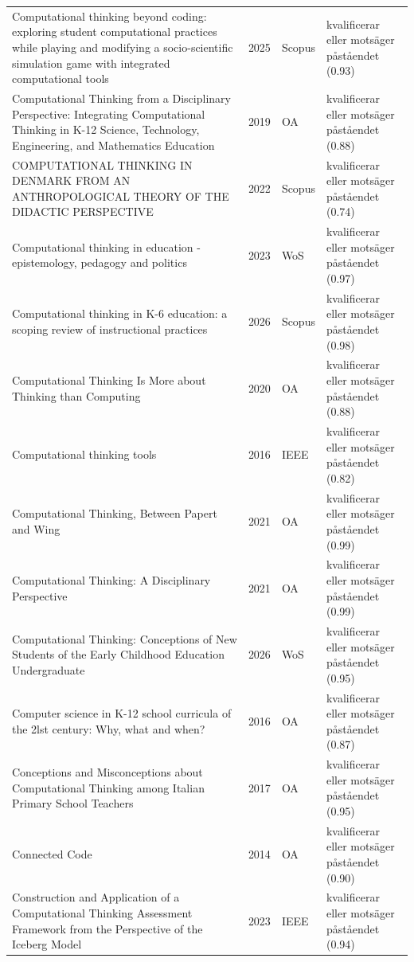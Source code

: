 \begin{longtable}{@{}%
  >{\raggedright\arraybackslash}p{}c%
  >{\raggedright\arraybackslash}p{}%
  >{\raggedright\arraybackslash}p{}@{}}
Computational thinking beyond coding: exploring student computational practices while playing and modifying a socio-scientific simulation game with integrated computational tools & 2025 & Scopus & kvalificerar eller motsäger påståendet (0.93) \\
Computational Thinking from a Disciplinary Perspective: Integrating Computational Thinking in K-12 Science, Technology, Engineering, and Mathematics Education & 2019 & OA & kvalificerar eller motsäger påståendet (0.88) \\
COMPUTATIONAL THINKING IN DENMARK FROM AN ANTHROPOLOGICAL THEORY OF THE DIDACTIC PERSPECTIVE & 2022 & Scopus & kvalificerar eller motsäger påståendet (0.74) \\
Computational thinking in education - epistemology, pedagogy and politics & 2023 & WoS & kvalificerar eller motsäger påståendet (0.97) \\
Computational thinking in K-6 education: a scoping review of instructional practices & 2026 & Scopus & kvalificerar eller motsäger påståendet (0.98) \\
Computational Thinking Is More about Thinking than Computing & 2020 & OA & kvalificerar eller motsäger påståendet (0.88) \\
Computational thinking tools & 2016 & IEEE & kvalificerar eller motsäger påståendet (0.82) \\
Computational Thinking, Between Papert and Wing & 2021 & OA & kvalificerar eller motsäger påståendet (0.99) \\
Computational Thinking: A Disciplinary Perspective & 2021 & OA & kvalificerar eller motsäger påståendet (0.99) \\
Computational Thinking: Conceptions of New Students of the Early Childhood Education Undergraduate & 2026 & WoS & kvalificerar eller motsäger påståendet (0.95) \\
Computer science in K-12 school curricula of the 2lst century: Why, what and when? & 2016 & OA & kvalificerar eller motsäger påståendet (0.87) \\
Conceptions and Misconceptions about Computational Thinking among Italian Primary School Teachers & 2017 & OA & kvalificerar eller motsäger påståendet (0.95) \\
Connected Code & 2014 & OA & kvalificerar eller motsäger påståendet (0.90) \\
Construction and Application of a Computational Thinking Assessment Framework from the Perspective of the Iceberg Model & 2023 & IEEE & kvalificerar eller motsäger påståendet (0.94) \\

\end{longtable}

